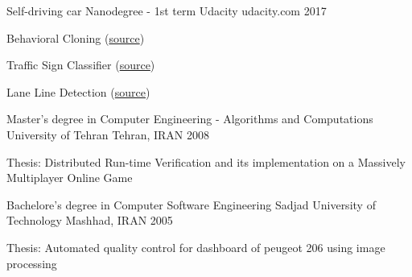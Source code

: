 

\begin{cventries}

  \cventry
  {Self-driving car Nanodegree - 1st term } %
  {Udacity} %
  {udacity.com} %
  {2017} %
  {
    \begin{cvitems} %
      \item {Behavioral Cloning (\href{https://github.com/zaghaghi/CarND-Behavioral-Cloning-P3}{source})}
      \item {Traffic Sign Classifier (\href{https://github.com/zaghaghi/CarND-Traffic-Sign-Classifier-Project}{source})}
      \item {Lane Line Detection (\href{https://github.com/zaghaghi/CarND-LaneLines-P1}{source})}
    \end{cvitems}
  }

\cventry
{Master's degree in Computer Engineering - Algorithms and Computations} %
{University of Tehran} %
{Tehran, IRAN} %
{2008} %
{
  \begin{cvitems} %
    \item {Thesis: Distributed Run-time Verification and its implementation on a Massively Multiplayer Online Game}
  \end{cvitems}
}

  \cventry
    {Bachelore's degree in Computer Software Engineering } %
    {Sadjad University of Technology} %
    {Mashhad, IRAN} %
    {2005} %
    {
      \begin{cvitems} %
        \item {Thesis: Automated quality control for dashboard of peugeot 206 using image processing}
      \end{cvitems}
    }


\end{cventries}
